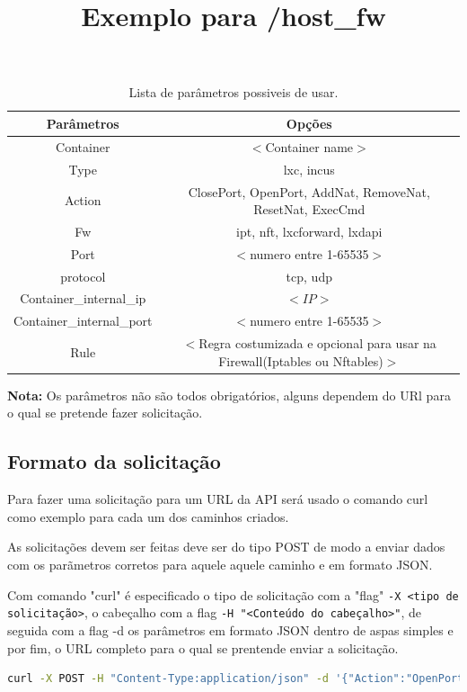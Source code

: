 \begin{table}[H]
\centering
\begin{tabular}{|c|c|}
\hline
\rowcolor{yellow!50}\textbf{Parâmetros} & \textbf{Opções}\\
\hline
Container & $<$Container name$>$\\
\hline
Type & lxc, incus \\
\hline
Action & ClosePort, OpenPort, AddNat, RemoveNat, ResetNat, ExecCmd \\
\hline
Fw & ipt, nft, lxcforward, lxdapi \\
\hline
Port & $<$numero entre 1-65535$>$ \\
\hline
protocol & tcp, udp \\
\hline
Container\_internal\_ip & $<IP>$ \\
\hline
Container\_internal\_port & $<$numero entre 1-65535$>$ \\
\hline
Rule & $<$Regra costumizada e opcional para usar na Firewall(Iptables ou Nftables)$>$ \\
\hline
\end{tabular}
\caption{Lista de parâmetros possiveis de usar.}
\label{arglist}
\end{table}

\textbf{Nota:} Os parâmetros não são todos obrigatórios, alguns dependem do URl para o qual
se pretende fazer solicitação.


\subsection{Formato da solicitação}

Para fazer uma solicitação para um URL da API será usado o comando curl como exemplo para
cada um dos caminhos criados.

As solicitações devem ser feitas deve ser do tipo POST de modo a enviar dados com os parãmetros
corretos para aquele aquele caminho e em formato JSON.

Com comando "curl" é especificado o tipo de solicitação com a "flag" \texttt{-X <tipo de solicitação>},
o cabeçalho com a flag \texttt{-H "<Conteúdo do cabeçalho>"}, de seguida com a flag -d os parâmetros
em formato JSON dentro de aspas simples e por fim, o URL completo para o qual se prentende enviar a
solicitação.



\title*{Exemplo para \slash \textbf{host\_fw}}

\begin{lstlisting}[language=Bash, caption={Exemplo de solicitação para a firewal do sistema host}]
    curl -X POST -H "Content-Type:application/json" -d '{"Action":"OpenPort","Fw":"ipt","Protocol":"tcp","Port":"22"}' http://localhost:5000/host_fw
\end{lstlisting}



